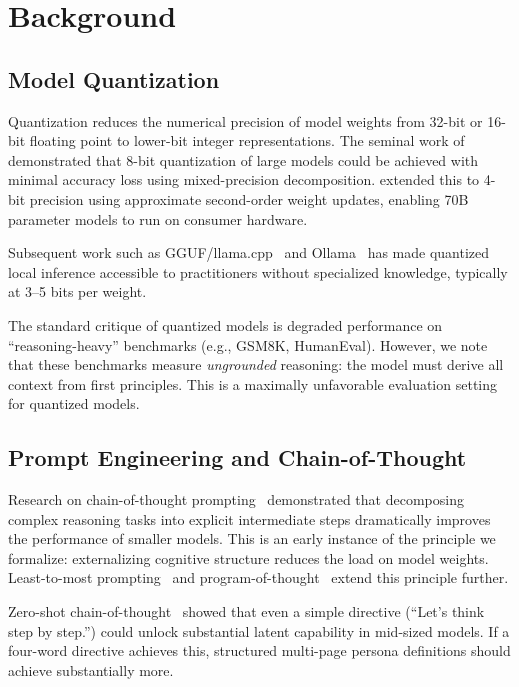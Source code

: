 \documentclass[11pt,a4paper]{article}
\begin{document}
\section{Background}
\label{sec:background}

\subsection{Model Quantization}

Quantization reduces the numerical precision of model weights from 32-bit or
16-bit floating point to lower-bit integer representations. The seminal work
of \citet{dettmers2022llmint8} demonstrated that 8-bit quantization of large
models could be achieved with minimal accuracy loss using mixed-precision
decomposition. \citet{frantar2022gptq} extended this to 4-bit precision using
approximate second-order weight updates, enabling 70B parameter models to run
on consumer hardware.

Subsequent work such as GGUF/llama.cpp~\citep{gerganov2023llamacpp} and
Ollama~\citep{ollama2023} has made quantized local inference accessible to
practitioners without specialized knowledge, typically at 3--5 bits per weight.

The standard critique of quantized models is degraded performance on
``reasoning-heavy'' benchmarks (e.g., GSM8K, HumanEval). However, we note
that these benchmarks measure \emph{ungrounded} reasoning: the model must
derive all context from first principles. This is a maximally unfavorable
evaluation setting for quantized models.

\subsection{Prompt Engineering and Chain-of-Thought}

Research on chain-of-thought prompting~\citep{wei2022chain} demonstrated that
decomposing complex reasoning tasks into explicit intermediate steps
dramatically improves the performance of smaller models. This is an early
instance of the principle we formalize: externalizing cognitive structure
reduces the load on model weights. Least-to-most prompting~\citep{zhou2022least}
and program-of-thought~\citep{chen2022program} extend this principle further.

Zero-shot chain-of-thought~\citep{kojima2022large} showed that even a simple
directive (``Let's think step by step.'') could unlock substantial latent
capability in mid-sized models. If a four-word directive achieves this,
structured multi-page persona definitions should achieve substantially more.
\end{document}
